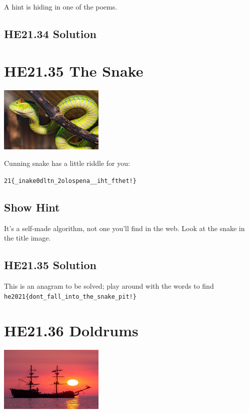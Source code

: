 \documentclass[english,a4paper,nols,noindent]{tufte-handout}
\begin{document}
A hint is hiding in one of the poems.

\hypertarget{he21.34-solution}{%
\subsection{HE21.34 Solution}\label{he21.34-solution}}

\noindent 


\hypertarget{he21.35}{%
\section{HE21.35 The Snake}
  \label{he21.35}}
\begin{marginfigure}
    \includegraphics[width=50mm]{images/challenge35.jpg}
\end{marginfigure}

\noindent Cunning snake has a little riddle for you:

\verb+21{_inake0dltn_2olospena__iht_fthet!}+

\subsection{Show Hint}
It's a self-made algorithm, not one you'll find in the web.
Look at the snake in the title image.


\hypertarget{he21.35-solution}{%
\subsection{HE21.35 Solution}\label{he21.35-solution}}

\noindent This is an anagram to be solved; play around with the words to find
\verb+he2021{dont_fall_into_the_snake_pit!}+


\hypertarget{he21.36}{%
\section{HE21.36 Doldrums}
  \label{he21.36}}
\begin{marginfigure}
    \includegraphics[width=50mm]{images/challenge36.jpg}
\end{marginfigure}
\end{document}
